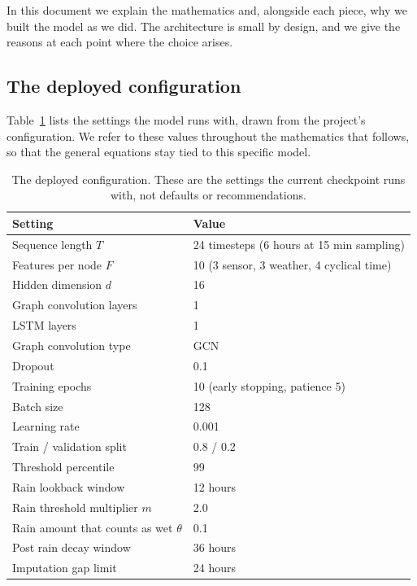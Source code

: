 \documentclass{article}
\begin{document}
In this document we explain the mathematics and, alongside each piece, why we
built the model as we did. The architecture is small by design, and we give
the reasons at each point where the choice arises.

\subsection{The deployed configuration}
\label{sec:configuration}

Table~\ref{tab:config} lists the settings the model runs with, drawn from the
project's configuration. We refer to these values throughout the mathematics
that follows, so that the general equations stay tied to this specific model.

\begin{table}[t]
  \centering
  \caption{The deployed configuration. These are the settings the current
    checkpoint runs with, not defaults or recommendations.}
  \label{tab:config}
  \begin{tabular}{ll}
    \toprule
    Setting & Value \\
    \midrule
    Sequence length $T$ & 24 timesteps (6 hours at 15 min sampling) \\
    Features per node $F$ & 10 (3 sensor, 3 weather, 4 cyclical time) \\
    Hidden dimension $d$ & 16 \\
    Graph convolution layers & 1 \\
    LSTM layers & 1 \\
    Graph convolution type & GCN \\
    Dropout & 0.1 \\
    Training epochs & 10 (early stopping, patience 5) \\
    Batch size & 128 \\
    Learning rate & 0.001 \\
    Train / validation split & 0.8 / 0.2 \\
    Threshold percentile & 99 \\
    Rain lookback window & 12 hours \\
    Rain threshold multiplier $m$ & 2.0 \\
    Rain amount that counts as wet $\theta$ & 0.1 \\
    Post rain decay window & 36 hours \\
    Imputation gap limit & 24 hours \\
    \bottomrule
  \end{tabular}
\end{table}
\end{document}
